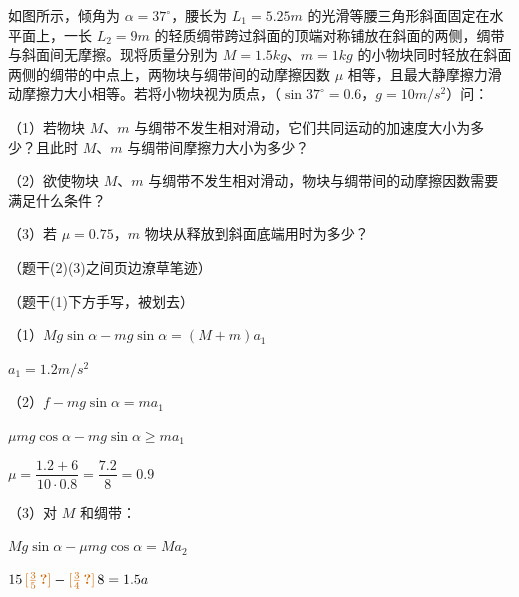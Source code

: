 \begin{problem}[21.（2+2+4=8）]
如图所示，倾角为 $\alpha=37^\circ$，腰长为 $L_1=5.25\unit{m}$ 的光滑等腰三角形斜面固定在水平面上，一长 $L_2=9\unit{m}$ 的轻质绸带跨过斜面的顶端对称铺放在斜面的两侧，绸带与斜面间无摩擦。现将质量分别为 $M=1.5\unit{kg}$、$m=1\unit{kg}$ 的小物块同时轻放在斜面两侧的绸带的中点上，两物块与绸带间的动摩擦因数 $\mu$ 相等，且最大静摩擦力滑动摩擦力大小相等。若将小物块视为质点，（$\sin37^\circ=0.6$，$g=10\unit{m/s^2}$）问：%

（1）若物块 $M$、$m$ 与绸带不发生相对滑动，它们共同运动的加速度大小为多少？且此时 $M$、$m$ 与绸带间摩擦力大小为多少？

（2）欲使物块 $M$、$m$ 与绸带不发生相对滑动，物块与绸带间的动摩擦因数需要满足什么条件？

（3）若 $\mu=0.75$，$m$ 物块从释放到斜面底端用时为多少？

（题干(2)(3)之间页边潦草笔迹）


\begin{solution}
（题干(1)下方手写，被划去）

（1）$Mg\sin\alpha-mg\sin\alpha=(M+m)a_1$

\hspace{1.6em}$a_1=1.2\unit{m/s^2}$

（2）$f-mg\sin\alpha=ma_1$

\hspace{1.6em}$\mu mg\cos\alpha-mg\sin\alpha\ge ma_1$

\hspace{1.6em}$\mu=\dfrac{1.2+6}{10\cdot0.8}=\dfrac{7.2}{8}=0.9$%

（3）对 $M$ 和绸带：

\hspace{1.6em}$Mg\sin\alpha-\mu mg\cos\alpha=Ma_2$

\hspace{1.6em}$15\,\unclear{\frac{3}{5}}-\unclear{\frac{3}{4}}\,8=1.5a$%


\end{solution}
\end{problem}
